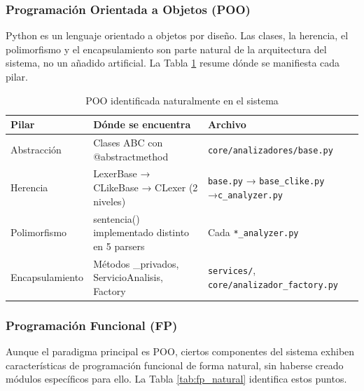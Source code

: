 \documentclass[12pt,a4paper]{article}
\begin{document}
\subsubsection{Programación Orientada a Objetos (POO)}

Python es un lenguaje orientado a objetos por diseño. Las clases, la herencia, el polimorfismo y el encapsulamiento son parte natural de la arquitectura del sistema, no un añadido artificial. La Tabla \ref{tab:poo_natural} resume dónde se manifiesta cada pilar.

\begin{table}[H]
\centering
\footnotesize
\caption{POO identificada naturalmente en el sistema}
\label{tab:poo_natural}
\begin{tabular}{@{}>{\raggedright\arraybackslash}p{2.2cm}>{\raggedright\arraybackslash}p{4.2cm}>{\raggedright\arraybackslash}p{5.6cm}@{}}
\toprule
\textbf{Pilar} & \textbf{Dónde se encuentra} & \textbf{Archivo} \\
\midrule
Abstracción & Clases ABC con @abstractmethod & \texttt{core/analizadores/}\linebreak\texttt{base.py} \\
Herencia & LexerBase → CLikeBase → CLexer (2 niveles) & \texttt{base.py} → \texttt{base\_clike.py} →\linebreak\texttt{c\_analyzer.py} \\
Polimorfismo & sentencia() implementado distinto en 5 parsers & Cada \texttt{*\_analyzer.py} \\
Encapsulamiento & Métodos \_privados, ServicioAnalisis, Factory & \texttt{services/}, \texttt{core/}\linebreak\texttt{analizador\_factory.py} \\
\bottomrule
\end{tabular}
\end{table}

\subsubsection{Programación Funcional (FP)}

Aunque el paradigma principal es POO, ciertos componentes del sistema exhiben características de programación funcional de forma natural, sin haberse creado módulos específicos para ello. La Tabla \ref{tab:fp_natural} identifica estos puntos.
\end{document}
